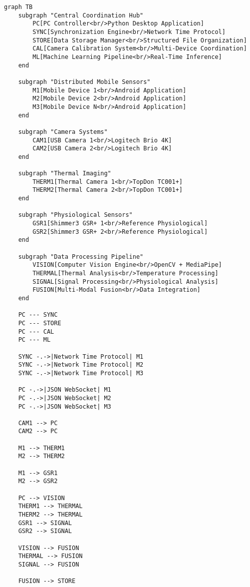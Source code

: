 \documentclass[12pt,a4paper]{article}
\begin{document}
\begin{verbatim}
graph TB
    subgraph "Central Coordination Hub"
        PC[PC Controller<br/>Python Desktop Application]
        SYNC[Synchronization Engine<br/>Network Time Protocol]
        STORE[Data Storage Manager<br/>Structured File Organization]
        CAL[Camera Calibration System<br/>Multi-Device Coordination]
        ML[Machine Learning Pipeline<br/>Real-Time Inference]
    end
    
    subgraph "Distributed Mobile Sensors"
        M1[Mobile Device 1<br/>Android Application]
        M2[Mobile Device 2<br/>Android Application]
        M3[Mobile Device N<br/>Android Application]
    end
    
    subgraph "Camera Systems"
        CAM1[USB Camera 1<br/>Logitech Brio 4K]
        CAM2[USB Camera 2<br/>Logitech Brio 4K]
    end
    
    subgraph "Thermal Imaging"
        THERM1[Thermal Camera 1<br/>TopDon TC001+]
        THERM2[Thermal Camera 2<br/>TopDon TC001+]
    end
    
    subgraph "Physiological Sensors"
        GSR1[Shimmer3 GSR+ 1<br/>Reference Physiological]
        GSR2[Shimmer3 GSR+ 2<br/>Reference Physiological]
    end
    
    subgraph "Data Processing Pipeline"
        VISION[Computer Vision Engine<br/>OpenCV + MediaPipe]
        THERMAL[Thermal Analysis<br/>Temperature Processing]
        SIGNAL[Signal Processing<br/>Physiological Analysis]
        FUSION[Multi-Modal Fusion<br/>Data Integration]
    end
    
    PC --- SYNC
    PC --- STORE
    PC --- CAL
    PC --- ML
    
    SYNC -.->|Network Time Protocol| M1
    SYNC -.->|Network Time Protocol| M2
    SYNC -.->|Network Time Protocol| M3
    
    PC -.->|JSON WebSocket| M1
    PC -.->|JSON WebSocket| M2
    PC -.->|JSON WebSocket| M3
    
    CAM1 --> PC
    CAM2 --> PC
    
    M1 --> THERM1
    M2 --> THERM2
    
    M1 --> GSR1
    M2 --> GSR2
    
    PC --> VISION
    THERM1 --> THERMAL
    THERM2 --> THERMAL
    GSR1 --> SIGNAL
    GSR2 --> SIGNAL
    
    VISION --> FUSION
    THERMAL --> FUSION
    SIGNAL --> FUSION
    
    FUSION --> STORE
\end{verbatim}
\end{document}
